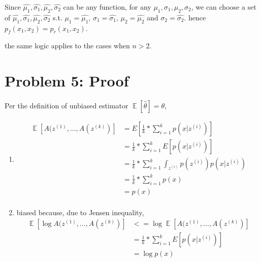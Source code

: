 \documentclass[12pt]{article}
\DeclareMathOperator{\E}{\mathbb{E}}
\begin{document}
Since $\hat{\mu_1}, \hat{\sigma_1},\hat{\mu_2}, \hat{\sigma_2}$ can be any function, for any $\mu_1, \sigma_1, \mu_2, \sigma_2$, we can choose a set of $\hat{\mu_1}, \hat{\sigma_1},\hat{\mu_2}, \hat{\sigma_2}$ s.t. $\mu_1=\hat{\mu_1}$, $\sigma_1=\hat{\sigma_1}$, $\mu_2=\hat{\mu_2}$ and $\sigma_2=\hat{\sigma_2}$. hence $p_f(x_1, x_2)  = p_r(x_1, x_2)$.

the same logic applies to the cases when $n>2$.

\section*{Problem 5: Proof}

Per the definition of unbiased estimator  $\E[\hat{\theta}] = \theta$,
\begin{enumerate}
	\item 
	\begin{equation}
	\begin{split}
	\E[A(z^{(1)}, ...,  A(z^{(k)})  ]	&= E[ \frac{1}{k} * \sum_{i=1}^k{p(x|z^{(i)})   }   ] \\
	&= \frac{1}{k} * \sum_{i=1}^k{E[p(x|z^{(i)})  ]} \\
	&= \frac{1}{k} * \sum_{i=1}^k{\int_{z^{(i)}}p(z^{(i)})p(x|z^{(i)})}  \\
	& = \frac{1}{k} * \sum_{i=1}^k{p(x)} \\
	&= p(x) \\
	\end{split}
	\end{equation}
	
	\item biased because, due to Jensen inequality,
	\begin{equation}
	\begin{split}
	\E[\log{A(z^{(1)}, ...,  A(z^{(k)}) } ]	&<= \log{\E[A(z^{(1)}, ...,  A(z^{(k)})  ] } \\
	&= \frac{1}{k} * \sum_{i=1}^k{E[p(x|z^{(i)})  ]} \\
	&= \log{p(x)} \\
	\end{split}
	\end{equation}
\end{enumerate}
\end{document}
